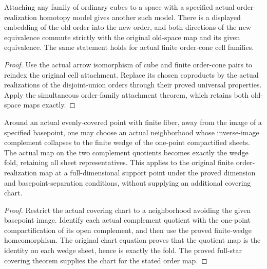 \begin{proposition}
  \label{prop:actual-order-models-of-cubical-attachments}
  \leanok
  Attaching any family of ordinary cubes to a space with a specified actual order-realization homotopy model gives another such model. There is a displayed embedding of the old order into the new order, and both directions of the new equivalence commute strictly with the original old-space map and its given equivalence. The same statement holds for actual finite order-cone cell families.
\end{proposition}
\begin{proof}
  Use the actual arrow isomorphism of cube and finite order-cone pairs to reindex the original cell attachment. Replace its chosen coproducts by the actual realizations of the disjoint-union orders through their proved universal properties. Apply the simultaneous order-family attachment theorem, which retains both old-space maps exactly.
  \leanok
\end{proof}

\begin{proposition}
  \label{prop:actual-covering-collapse-wedge-fold}
  \leanok
  Around an actual evenly-covered point with finite fiber, away from the image of a specified basepoint, one may choose an actual neighborhood whose inverse-image complement collapses to the finite wedge of the one-point compactified sheets. The actual map on the two complement quotients becomes exactly the wedge fold, retaining all sheet representatives. This applies to the original finite order-realization map at a full-dimensional support point under the proved dimension and basepoint-separation conditions, without supplying an additional covering chart.
\end{proposition}
\begin{proof}
  Restrict the actual covering chart to a neighborhood avoiding the given basepoint image. Identify each actual complement quotient with the one-point compactification of its open complement, and then use the proved finite-wedge homeomorphism. The original chart equation proves that the quotient map is the identity on each wedge sheet, hence is exactly the fold. The proved full-star covering theorem supplies the chart for the stated order map.
  \leanok
\end{proof}

